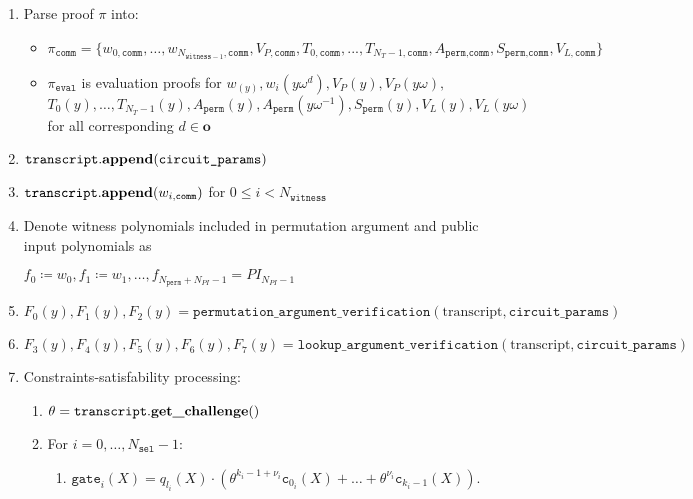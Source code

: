 \begin{enumerate}
	\item Parse proof $\pi$ into:
		\begin{itemize}
	            \item $\pi_{\texttt{comm}} = \{w_{0, \texttt{comm}}, \dots, w_{N_{\texttt{witness} - 1}, \texttt{comm}},
	                    V_{P, \texttt{comm}}, T_{0, \texttt{comm}}, ..., T_{N_T - 1, \texttt{comm}},
	                A_{\texttt{perm}, \texttt{comm}}, S_{\texttt{perm}, \texttt{comm}}, V_{L, \texttt{comm}} \}$
	            \item  $\pi_{\texttt{eval}}$ is evaluation proofs for $w_(y), w_i(y\omega^d),
	                V_P(y), V_P(y\omega),$ \\
	                $T_0(y), \dots, T_{N_T - 1}(y), A_{\texttt{perm}}(y), 
	                A_{\texttt{perm}}(y\omega^{-1}), S_{\texttt{perm}}(y), V_L(y), V_L(y\omega)$
	                for all corresponding $d \in \textbf{o}$
	      \end{itemize}
	\item $\texttt{transcript}.\textbf{append}(\texttt{circuit\_params})$
	\item $\texttt{transcript}.\textbf{append}(w_{i, \texttt{comm}})$ for $0 \leq i < N_{\texttt{witness}}$
	\item \label{step:f-i-verifier}Denote witness polynomials included in permutation argument and public input polynomials as 
    	\begin{center}
    		$f_0 \coloneqq w_0, f_1 \coloneqq w_1, \dots, f_{N_{\texttt{perm}} + N_{PI} - 1} = PI_{N_{PI} - 1}$
    	\end{center}
    \item $F_0(y), F_1(y), F_2(y) = 
    			\texttt{permutation\_argument\_verification}(\text{transcript}, \texttt{circuit\_params})$
    \item $F_3(y), F_4(y), F_5(y), F_6(y), F_7(y) = 
    			\texttt{lookup\_argument\_verification}(\text{transcript}, \texttt{circuit\_params})$
	\item Constraints-satisfability processing:
	\begin{enumerate}
		\item $\theta = \texttt{transcript}.\textbf{get\_challenge}()$
		\item For $i = 0, \dots, N_{\texttt{sel}} - 1$:
	    \begin{enumerate}
	    	\item $\texttt{gate}_i(X) = q_{l_i}(X) \cdot (\theta^{k_i - 1 + \nu_i}\texttt{c}_{0_i}(X) + \dots + \theta^{\nu_i}\texttt{c}_{k_i - 1}(X))$. 
	    \end{enumerate}

\end{enumerate}
\end{enumerate}
